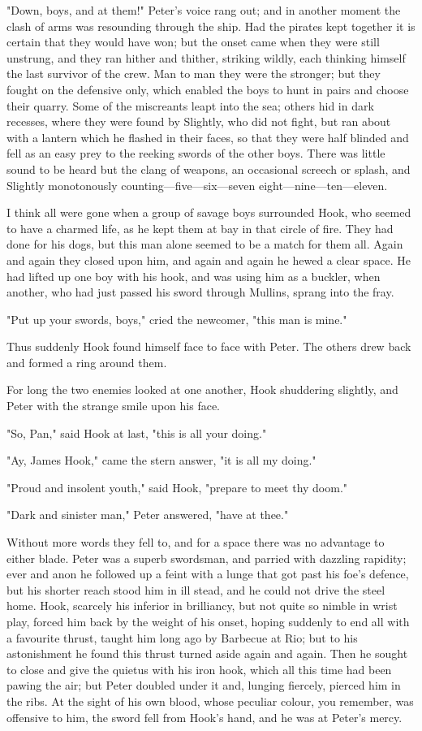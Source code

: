 "Down, boys, and at them!" Peter's voice rang out; and in another moment
the clash of arms was resounding through the ship. Had the pirates kept
together it is certain that they would have won; but the onset came when
they were still unstrung, and they ran hither and thither, striking
wildly, each thinking himself the last survivor of the crew. Man to man
they were the stronger; but they fought on the defensive only, which
enabled the boys to hunt in pairs and choose their quarry. Some of the
miscreants leapt into the sea; others hid in dark recesses, where they
were found by Slightly, who did not fight, but ran about with a lantern
which he flashed in their faces, so that they were half blinded and fell
as an easy prey to the reeking swords of the other boys. There was little
sound to be heard but the clang of weapons, an occasional screech or
splash, and Slightly monotonously counting—five—six—seven
eight—nine—ten—eleven.


I think all were gone when a group of savage boys surrounded Hook, who
seemed to have a charmed life, as he kept them at bay in that circle of
fire. They had done for his dogs, but this man alone seemed to be a match
for them all. Again and again they closed upon him, and again and again he
hewed a clear space. He had lifted up one boy with his hook, and was using
him as a buckler, when another, who had just passed his sword
through Mullins, sprang into the fray.


"Put up your swords, boys," cried the newcomer, "this man is mine."


Thus suddenly Hook found himself face to face with Peter. The others drew
back and formed a ring around them.


For long the two enemies looked at one another, Hook shuddering slightly,
and Peter with the strange smile upon his face.


"So, Pan," said Hook at last, "this is all your doing."


"Ay, James Hook," came the stern answer, "it is all my doing."


"Proud and insolent youth," said Hook, "prepare to meet thy doom."


"Dark and sinister man," Peter answered, "have at thee."


Without more words they fell to, and for a space there was no advantage to
either blade. Peter was a superb swordsman, and parried with dazzling
rapidity; ever and anon he followed up a feint with a lunge that got past
his foe's defence, but his shorter reach stood him in ill stead, and he
could not drive the steel home. Hook, scarcely his inferior in brilliancy,
but not quite so nimble in wrist play, forced him back by the weight of
his onset, hoping suddenly to end all with a favourite thrust, taught him
long ago by Barbecue at Rio; but to his astonishment he found this thrust
turned aside again and again. Then he sought to close and give the quietus
with his iron hook, which all this time had been pawing the air; but Peter
doubled under it and, lunging fiercely, pierced him in the ribs. At the
sight of his own blood, whose peculiar colour, you remember, was offensive
to him, the sword fell from Hook's hand, and he was at Peter's mercy.


